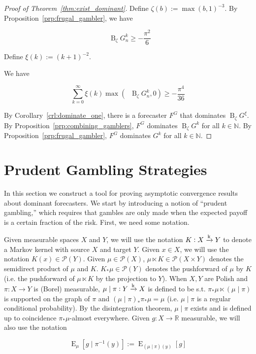 \documentclass[11pt]{article}
\theoremstyle{definition}
\theoremstyle{plain}
\newcommand{\Nats}{\mathbb{N}}
\newcommand{\Reals}{\mathbb{R}}
\newcommand{\B}{\operatorname{B}}
\DeclareMathOperator{\E}{E}
\newcommand{\M}{\xrightarrow{\textnormal{k}}}
\newcommand{\PM}{\mathcal{P}}
\DeclareMathOperator{\SVM}{\Sigma V_{\min}}
\begin{document}
\begin{proof}[Proof of Theorem~\ref{thm:exist_dominant}]

Define $\zeta(b) := \max(b,1)^{-3}$. By Proposition~\ref{prp:frugal_gambler}, we have

\[\SVM \B_{\zeta} G^k_n \geq -\frac{\pi^2}{6}\]

Define $\xi(k):=(k+1)^{-2}$.

We have

\[\sum_{k=0}^\infty \xi(k) \max(\SVM \B_{\zeta} G^k_n, 0) \geq -\frac{\pi^4}{36} \]

By Corollary~\ref{crl:dominate_one}, there is a forecaster $F^G$ that dominates $\B_\zeta G^\xi$. By Proposition~\ref{prp:combining_gamblers}, $F^G$ dominates $\B_\zeta G^k$ for all $k \in \Nats$. By Proposition~\ref{prp:frugal_gambler}, $F^G$ dominates $G^k$ for all $k \in \Nats$.
\end{proof}

\section{Prudent Gambling Strategies}
\label{sec:prudent}

In this section we construct a tool for proving asymptotic convergence results about dominant forecasters. We start by introducing a notion of \enquote{prudent gambling,} which requires that gambles are only made when the expected payoff is a certain fraction of the risk. First, we need some notation.

Given measurable spaces $X$ and $Y$, we will use the notation $K: X \M Y$ to denote a Markov kernel with source $X$ and target $Y$. Given $x \in X$, we will use the notation $K(x) \in \PM(Y)$. Given $\mu \in \PM(X)$, $\mu \ltimes K \in \PM(X \times Y)$ denotes the semidirect product of $\mu$ and $K$. $K_* \mu \in \PM(Y)$ denotes the pushforward of $\mu$ by $K$ (i.e. the pushforward of $\mu \ltimes K$ by the projection to $Y$). When $X,Y$ are Polish and $\pi: X \rightarrow Y$ is (Borel) measurable, $\mu \mid \pi: Y \M X$ is defined to be s.t. $\pi_* \mu \ltimes (\mu \mid \pi)$ is supported on the graph of $\pi$ and $(\mu \mid \pi)_* \pi_* \mu = \mu$ (i.e. $\mu \mid \pi$ is a regular conditional probability). By the disintegration theorem, $\mu \mid \pi$ exists and is defined up to coincidence $\pi_* \mu$-almost everywhere. Given $g: X \rightarrow \Reals$ measurable, we will also use the notation 

\begin{equation}
\E_{\mu}[g \mid \pi^{-1}(y)]:=\E_{(\mu \mid \pi)(y)}[g]
\end{equation}
\end{document}
